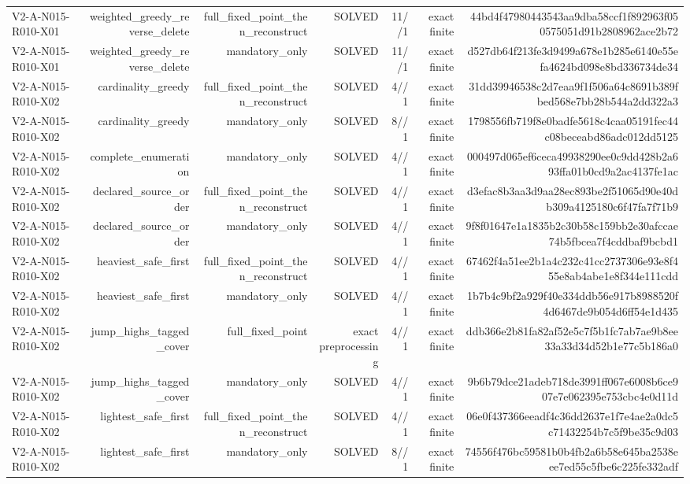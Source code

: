 {\begin{longtable}{lrrrrrr}
V2-A-N015-R010-X01 & weighted\_greedy\_reverse\_delete & full\_fixed\_point\_then\_reconstruct & SOLVED & 11//1 & exact finite & 44bd4f47980443543aa9dba58ccf1f892963f050575051d91b2808962ace2b72 \\
V2-A-N015-R010-X01 & weighted\_greedy\_reverse\_delete & mandatory\_only & SOLVED & 11//1 & exact finite & d527db64f213fe3d9499a678e1b285e6140e55efa4624bd098e8bd336734de34 \\
V2-A-N015-R010-X02 & cardinality\_greedy & full\_fixed\_point\_then\_reconstruct & SOLVED & 4//1 & exact finite & 31dd39946538c2d7eaa9f1f506a64c8691b389fbed568e7bb28b544a2dd322a3 \\
V2-A-N015-R010-X02 & cardinality\_greedy & mandatory\_only & SOLVED & 8//1 & exact finite & 1798556fb719f8e0badfe5618c4caa05191fec44c08beceabd86adc012dd5125 \\
V2-A-N015-R010-X02 & complete\_enumeration & mandatory\_only & SOLVED & 4//1 & exact finite & 000497d065ef6ceca49938290ee0c9dd428b2a693ffa01b0cd9a2ac4137fe1ac \\
V2-A-N015-R010-X02 & declared\_source\_order & full\_fixed\_point\_then\_reconstruct & SOLVED & 4//1 & exact finite & d3efac8b3aa3d9aa28ec893be2f51065d90e40db309a4125180c6f47fa7f71b9 \\
V2-A-N015-R010-X02 & declared\_source\_order & mandatory\_only & SOLVED & 4//1 & exact finite & 9f8f01647e1a1835b2c30b58c159bb2e30afccae74b5fbcea7f4cddbaf9bcbd1 \\
V2-A-N015-R010-X02 & heaviest\_safe\_first & full\_fixed\_point\_then\_reconstruct & SOLVED & 4//1 & exact finite & 67462f4a51ee2b1a4c232c41cc2737306e93e8f455e8ab4abe1e8f344e111cdd \\
V2-A-N015-R010-X02 & heaviest\_safe\_first & mandatory\_only & SOLVED & 4//1 & exact finite & 1b7b4c9bf2a929f40e334ddb56e917b8988520f4d6467de9b054d6ff54e1d435 \\
V2-A-N015-R010-X02 & jump\_highs\_tagged\_cover & full\_fixed\_point & exact preprocessing & 4//1 & exact finite & ddb366e2b81fa82af52e5c7f5b1fc7ab7ae9b8ee33a33d34d52b1e77c5b186a0 \\
V2-A-N015-R010-X02 & jump\_highs\_tagged\_cover & mandatory\_only & SOLVED & 4//1 & exact finite & 9b6b79dce21adeb718de3991ff067e6008b6ce907e7e062395e753cbc4e0d11d \\
V2-A-N015-R010-X02 & lightest\_safe\_first & full\_fixed\_point\_then\_reconstruct & SOLVED & 4//1 & exact finite & 06e0f437366eeadf4c36dd2637e1f7e4ae2a0dc5c71432254b7c5f9be35c9d03 \\
V2-A-N015-R010-X02 & lightest\_safe\_first & mandatory\_only & SOLVED & 8//1 & exact finite & 74556f476bc59581b0b4fb2a6b58e645ba2538eee7ed55c5fbe6c225fe332adf \\

\end{longtable}}
